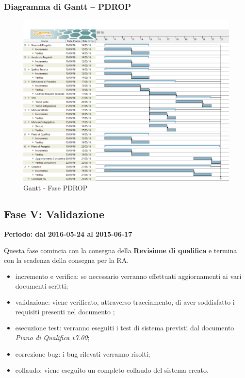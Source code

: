 \documentclass[../PianoProgetto.tex]{subfiles}
\begin{document}
		\subsubsection{Diagramma di Gantt – PDROP}
			\begin{figure}[!h]
				\centering
				\includegraphics[width=\textwidth]{gantt_png/6-requisiti_facoltativi}
				\caption{Gantt - Fase PDROP}
				\label{fig:Gantt - Fase PDROP}
			\end{figure}
			
\newpage
	\subsection{Fase V: Validazione}
		\textbf{Periodo: dal 2016-05-24 al 2015-06-17}
		
		Questa fase comincia con la consegna della \textbf{Revisione di qualifica} e termina con la scadenza della consegna per la RA.

		\begin{itemize}
				\item incremento e verifica: se necessario verranno effettuati aggiornamenti ai vari documenti scritti;

				\item validazione: viene verificato, attraverso tracciamento, di aver soddisfatto i requisiti presenti nel documento \analisideirequisitiv ;

				\item esecuzione test: verranno eseguiti i test di sistema previsti dal documento \textit{Piano di Qualifica v7.00};

				\item correzione bug: i bug rilevati verranno risolti;

				\item collaudo: viene eseguito un completo collaudo del sistema creato.
		\end{itemize}
		
\end{document}
